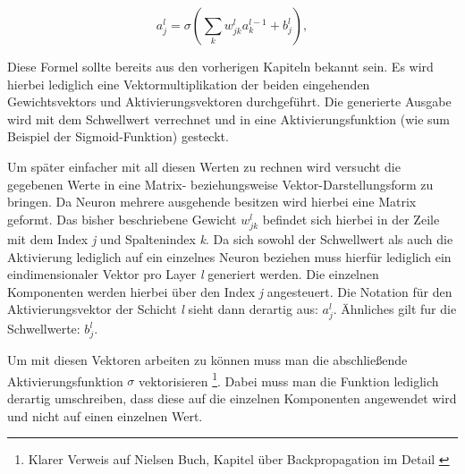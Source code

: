 \begin{equation} \label{eq:act}
a^{l}_j = \sigma\left( \sum_k w^{l}_{jk} a^{l-1}_k + b^l_j \right),
\end{equation}

Diese Formel sollte bereits aus den vorherigen Kapiteln bekannt sein. Es wird hierbei lediglich eine Vektormultiplikation der beiden eingehenden Gewichtsvektors und Aktivierungsvektoren durchgeführt. Die generierte Ausgabe wird mit dem Schwellwert verrechnet und in eine Aktivierungsfunktion (wie sum Beispiel der Sigmoid-Funktion) gesteckt.

Um später einfacher mit all diesen Werten zu rechnen wird versucht die gegebenen Werte in eine Matrix- beziehungsweise Vektor-Darstellungsform zu bringen. Da Neuron mehrere ausgehende  besitzen wird hierbei eine Matrix geformt. Das bisher beschriebene Gewicht $w^l_{jk}$ befindet sich hierbei in der Zeile mit dem Index \emph{j} und Spaltenindex \emph{k}. Da sich sowohl der Schwellwert als auch die Aktivierung lediglich auf ein einzelnes Neuron beziehen muss hierfür lediglich ein eindimensionaler Vektor pro Layer \emph{l} generiert werden. Die einzelnen Komponenten werden hierbei über den Index \emph{j} angesteuert. Die Notation für den Aktivierungsvektor der Schicht \emph{l} sieht dann derartig aus: $a^l_j$. Ähnliches gilt fur die Schwellwerte: $b^l_j$. 

Um mit diesen Vektoren arbeiten zu können muss man die abschließende Aktivierungsfunktion $\sigma$ vektorisieren 
\footnote{Klarer Verweis auf Nielsen Buch, Kapitel über Backpropagation im Detail \cite{dlnielsen}}. 
Dabei muss man die Funktion lediglich derartig umschreiben, dass diese auf die einzelnen Komponenten angewendet wird und nicht auf einen einzelnen Wert. 